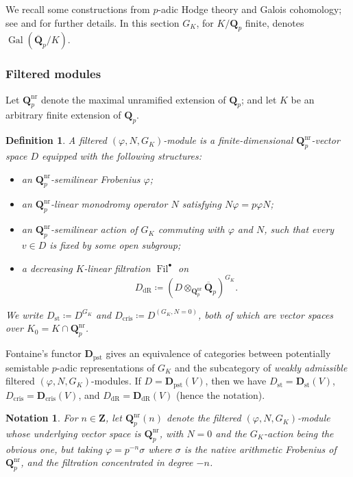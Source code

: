 \documentclass[cjm]{ipart}
\theoremstyle{plain}
\newtheorem{definition}[theorem]{Definition}
\newtheorem{notation}[theorem]{Notation}
\theoremstyle{remark}
\DeclareMathOperator{\Fil}{Fil}
\DeclareMathOperator{\Gal}{Gal}
\DeclareMathOperator{\st}{st}
\newcommand{\Dcris}{\mathbf{D}_{\mathrm{cris}}}
\newcommand{\DdR}{\mathbf{D}_{\mathrm{dR}}}
\newcommand{\Dpst}{\mathbf{D}_{\mathrm{pst}}}
\newcommand{\QQbar}{\overline{\QQ}}
\newcommand{\QQ}{\mathbf{Q}}
\newcommand{\Qp}{\QQ_p}
\newcommand{\ZZ}{\mathbf{Z}}
\newcommand{\dR}{\mathrm{dR}}
\numberwithin{equation}{subsection}
\begin{document}
  We recall some constructions from $p$-adic Hodge theory and Galois cohomology; see \cite[\S 2D]{nekovarniziol16} and \cite[\S 1]{besserloefflerzerbes16} for further details. In this section $G_K$, for $K/\Qp$ finite, denotes $\Gal(\QQbar_p / K)$.

  \subsubsection*{Filtered modules}

   Let $\Qp^{\mathrm{nr}}$ denote the maximal unramified extension of $\Qp$; and let $K$ be an arbitrary finite extension of $\Qp$.

   \begin{definition}
    A \emph{filtered $(\varphi, N, G_K)$-module} is a finite-dimensional $\Qp^{\mathrm{nr}}$-vector space $D$ equipped with the following structures:
    \begin{itemize}
     \item an $\Qp^{\mathrm{nr}}$-semilinear Frobenius $\varphi$;
     \item an $\Qp^{\mathrm{nr}}$-linear monodromy operator $N$ satisfying $N\varphi = p \varphi N$;
     \item an $\Qp^{\mathrm{nr}}$-semilinear action of $G_K$ commuting with $\varphi$ and $N$, such that every $v \in D$ is fixed by some open subgroup;
     \item a decreasing $K$-linear filtration $\Fil^\bullet$ on
     \[
      D_{\dR} \coloneqq \left(D \otimes_{\Qp^{\mathrm{nr}}} \QQbar_p\right)^{G_K}.
     \]
    \end{itemize}
    We write $D_{\st} \coloneqq D^{G_K}$ and $D_{\mathrm{cris}} \coloneqq D^{(G_K, N = 0)}$, both of which are vector spaces over $K_0 = K \cap \Qp^{\mathrm{nr}}$.
   \end{definition}

   Fontaine's functor $\Dpst$ gives an equivalence of categories between potentially semistable $p$-adic representations of $G_K$ and the subcategory of \emph{weakly admissible} filtered $(\varphi, N, G_K)$-modules. If $D = \Dpst(V)$, then we have $D_{\st} = \mathbf{D}_{\st}(V)$, $D_{\mathrm{cris}} = \Dcris(V)$, and $D_{\dR} = \DdR(V)$ (hence the notation).

   \begin{notation}
    For $n \in \ZZ$, let $\Qp^{\mathrm{nr}}(n)$ denote the filtered $(\varphi, N, G_K)$-module whose underlying vector space is $\Qp^{\mathrm{nr}}$, with $N=0$ and the $G_K$-action being the obvious one, but taking $\varphi = p^{-n} \sigma$ where $\sigma$ is the native arithmetic Frobenius of $\Qp^{\mathrm{nr}}$, and the filtration concentrated in degree $-n$.
   \end{notation}
\end{document}
